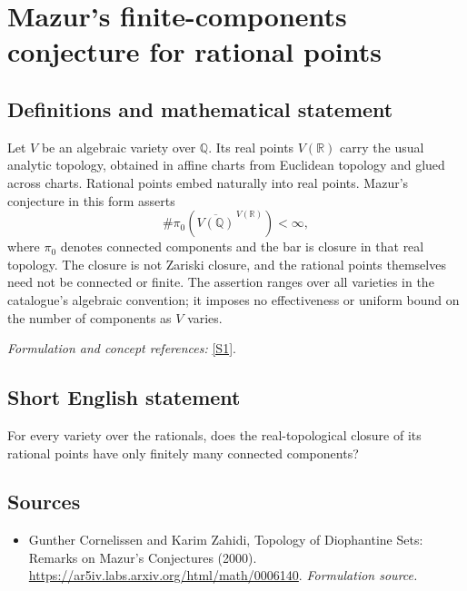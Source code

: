 \documentclass[11pt]{article}
\begin{document}
\section*{\texorpdfstring{Mazur's finite-components conjecture for rational points}{Mazur's finite-components conjecture for rational points}}\label{11300003}
\subsection{Definitions and mathematical statement}
Let $V$ be an algebraic variety over ${\mathbb{Q}}$. Its real points $V({\mathbb{R}})$ carry the usual analytic topology, obtained in affine charts from Euclidean topology and glued across charts. Rational points embed naturally into real points. Mazur's conjecture in this form asserts
\[
 \#\pi_0\!\left(\overline{V({\mathbb{Q}})}^{\,V({\mathbb{R}})}\right)<\infty,
\]
where $\pi_0$ denotes connected components and the bar is closure in that real topology. The closure is not Zariski closure, and the rational points themselves need not be connected or finite. The assertion ranges over all varieties in the catalogue's algebraic convention; it imposes no effectiveness or uniform bound on the number of components as $V$ varies.
\par\smallskip\textit{Formulation and concept references:} \href{https://ar5iv.labs.arxiv.org/html/math/0006140}{[S1]}.

\subsection{Short English statement}
For every variety over the rationals, does the real-topological closure of its rational points have only finitely many connected components?
\subsection{Sources}
\begin{itemize}
\item[S1]Gunther Cornelissen and Karim Zahidi, Topology of Diophantine Sets: Remarks on Mazur's Conjectures (2000).
\url{https://ar5iv.labs.arxiv.org/html/math/0006140}.
\textit{Formulation source.}
\end{itemize}
\end{document}
